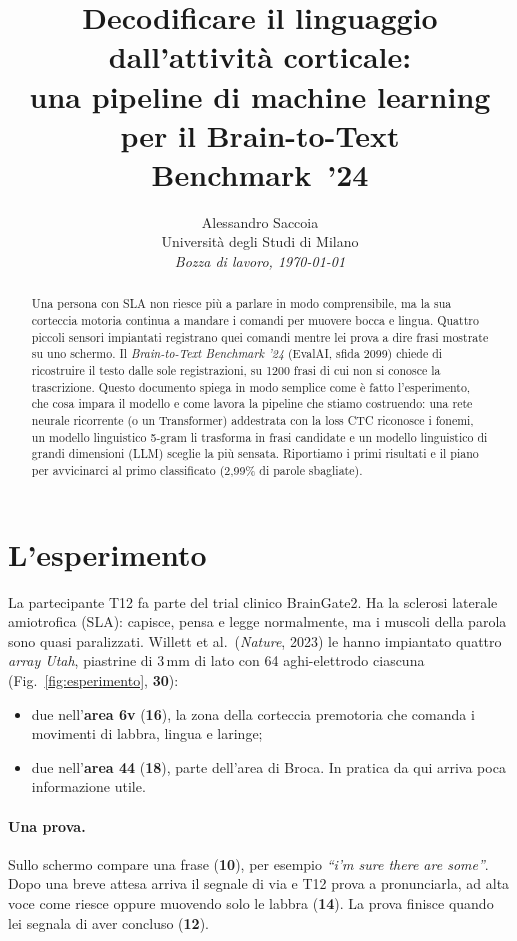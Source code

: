 \documentclass[10pt,a4paper]{article}
\title{Decodificare il linguaggio dall'attività corticale:\\
una pipeline di machine learning per il Brain-to-Text Benchmark~'24}
\author{Alessandro Saccoia\\\small Università degli Studi di Milano\\\small\textit{Bozza di lavoro, \today}}
\date{}
\begin{document}
\maketitle

\begin{abstract}
Una persona con SLA non riesce più a parlare in modo comprensibile, ma la sua corteccia motoria continua a mandare i comandi per muovere bocca e lingua. Quattro piccoli sensori impiantati registrano quei comandi mentre lei prova a dire frasi mostrate su uno schermo. Il \emph{Brain-to-Text Benchmark '24} (EvalAI, sfida 2099) chiede di ricostruire il testo dalle sole registrazioni, su 1200 frasi di cui non si conosce la trascrizione. Questo documento spiega in modo semplice come è fatto l'esperimento, che cosa impara il modello e come lavora la pipeline che stiamo costruendo: una rete neurale ricorrente (o un Transformer) addestrata con la loss CTC riconosce i fonemi, un modello linguistico 5-gram li trasforma in frasi candidate e un modello linguistico di grandi dimensioni (LLM) sceglie la più sensata. Riportiamo i primi risultati e il piano per avvicinarci al primo classificato (2{,}99\% di parole sbagliate).
\end{abstract}

\section{L'esperimento}

La partecipante T12 fa parte del trial clinico BrainGate2. Ha la sclerosi laterale amiotrofica (SLA): capisce, pensa e legge normalmente, ma i muscoli della parola sono quasi paralizzati. Willett et al.\ (\emph{Nature}, 2023) le hanno impiantato quattro \emph{array Utah}, piastrine di 3\,mm di lato con 64 aghi-elettrodo ciascuna (Fig.~\ref{fig:esperimento}, \textbf{30}):
\begin{itemize}\setlength\itemsep{0pt}
\item due nell'\textbf{area 6v} (\textbf{16}), la zona della corteccia premotoria che comanda i movimenti di labbra, lingua e laringe;
\item due nell'\textbf{area 44} (\textbf{18}), parte dell'area di Broca. In pratica da qui arriva poca informazione utile.
\end{itemize}

\paragraph{Una prova.} Sullo schermo compare una frase (\textbf{10}), per esempio \emph{``i'm sure there are some''}. Dopo una breve attesa arriva il segnale di via e T12 prova a pronunciarla, ad alta voce come riesce oppure muovendo solo le labbra (\textbf{14}). La prova finisce quando lei segnala di aver concluso (\textbf{12}).
\end{document}
